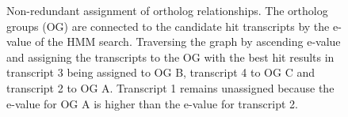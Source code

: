\begin{figure}[h]
	\centering
	\def\svgwidth{0.8\textwidth}
	
	\caption[Non-redundant assignment of ortholog relationships]{
		Non-redundant assignment of ortholog relationships. The ortholog groups (OG)
		are connected to the candidate hit transcripts by the e-value of the HMM
		search. Traversing the graph by ascending e-value and assigning the
		transcripts to the OG with the best hit results in transcript 3 being
		assigned to OG B, transcript 4 to OG C and transcript 2 to OG A. Transcript
		1 remains unassigned because the  e-value for OG A is higher than
		the e-value for transcript 2.
	}
	\label{fig:orthograph-graph}
\end{figure}

